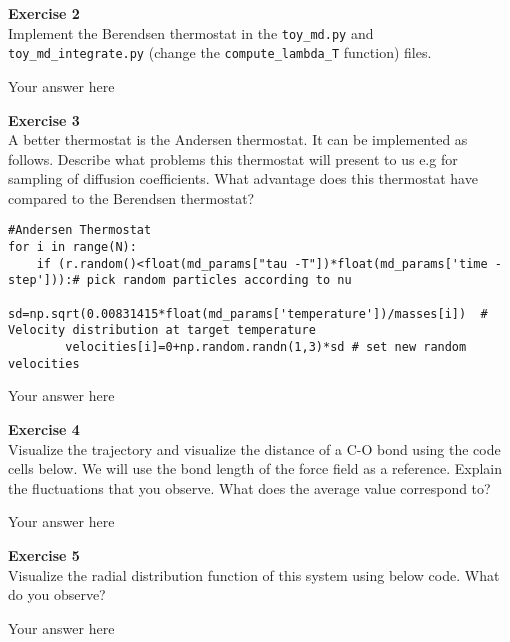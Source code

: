 \documentclass{article}
\begin{document}
\begin{mdframed}
\textbf{Exercise 2}\\
Implement the Berendsen thermostat in the \texttt{toy\_md.py} and \texttt{toy\_md\_integrate.py} (change the \texttt{compute\_lambda\_T} function) files.
\end{mdframed}

Your answer here

\begin{mdframed}
\textbf{Exercise 3}\\
A better thermostat is the Andersen thermostat. It can be implemented as follows. Describe what problems this thermostat will present to us e.g for sampling of diffusion coefficients. What advantage does this thermostat have compared to the Berendsen thermostat?

\begin{verbatim}
#Andersen Thermostat
for i in range(N):
    if (r.random()<float(md_params["tau -T"])*float(md_params['time -step'])):# pick random particles according to nu
        sd=np.sqrt(0.00831415*float(md_params['temperature'])/masses[i])  # Velocity distribution at target temperature
        velocities[i]=0+np.random.randn(1,3)*sd # set new random velocities
\end{verbatim}
\end{mdframed}

Your answer here

\begin{mdframed}
\textbf{Exercise 4}\\
Visualize the trajectory and visualize the distance of a C-O bond using the code cells below.
We will use the bond length of the force field as a reference.
Explain the fluctuations that you observe. What does the average value correspond to?
\end{mdframed}

Your answer here

\begin{mdframed}
\textbf{Exercise 5}\\
Visualize the radial distribution function of this system using below code. What do you observe?
\end{mdframed}

Your answer here
\end{document}
